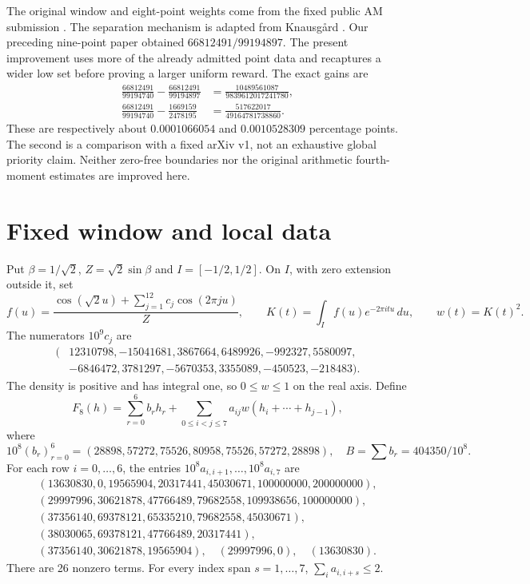 \documentclass[11pt,a4paper]{article}
\begin{document}
The original window and eight-point weights come from the fixed public
AM submission \cite{PC8}. The separation mechanism is adapted from
Knausg{\aa}rd \cite[Section~5]{Knaus}. Our preceding nine-point paper
\cite{Joint} obtained $66812491/99194897$. The present improvement
uses more of the already admitted point data and recaptures a wider
low set before proving a larger uniform reward. The exact gains are
\begin{align*}
\frac{66812491}{99194740}-\frac{66812491}{99194897}
 &=\frac{10489561087}{9839612017241780},\\
\frac{66812491}{99194740}-\frac{1669159}{2478195}
 &=\frac{517622017}{49164781738860}.
\end{align*}
These are respectively about $0.0001066054$ and $0.0010528309$
percentage points. The second is a comparison with a fixed arXiv v1,
not an exhaustive global priority claim. Neither zero-free boundaries
nor the original arithmetic fourth-moment estimates are improved here.

\section{Fixed window and local data}

Put $\beta=1/\sqrt2$, $Z=\sqrt2\sin\beta$ and $I=[-1/2,1/2]$.
On $I$, with zero extension outside it, set
\[
 f(u)=\frac{\cos(\sqrt2u)+\sum_{j=1}^{12}c_j\cos(2\pi ju)}{Z},
 \qquad K(t)=\int_I f(u)e^{-2\pi itu}\,du,\qquad w(t)=K(t)^2.
\]
The numerators $10^9c_j$ are
\[
\begin{split}
(&12310798,-15041681,3867664,6489926,-992327,5580097,\\
 &-6846472,3781297,-5670353,3355089,-450523,-218483).
\end{split}
\]
The density is positive and has integral one, so $0\le w\le1$ on
the real axis. Define
\[
 F_8(h)=\sum_{r=0}^6b_rh_r+
       \sum_{0\le i<j\le7}a_{ij}w(h_i+\cdots+h_{j-1}),
\]
where
\[
10^8(b_r)_{r=0}^6=(28898,57272,75526,80958,75526,57272,28898),
\quad B=\sum b_r=404350/10^8.
\]
For each row $i=0,\ldots,6$, the entries $10^8a_{i,i+1},\ldots,
10^8a_{i,7}$ are
\[
\begin{array}{l}
(13630830,0,19565904,20317441,45030671,100000000,200000000),\\
(29997996,30621878,47766489,79682558,109938656,100000000),\\
(37356140,69378121,65335210,79682558,45030671),\\
(38030065,69378121,47766489,20317441),\\
(37356140,30621878,19565904),\quad(29997996,0),\quad(13630830).
\end{array}
\]
There are 26 nonzero terms. For every index span $s=1,\ldots,7$,
$\sum_i a_{i,i+s}\le2$.
\end{document}
